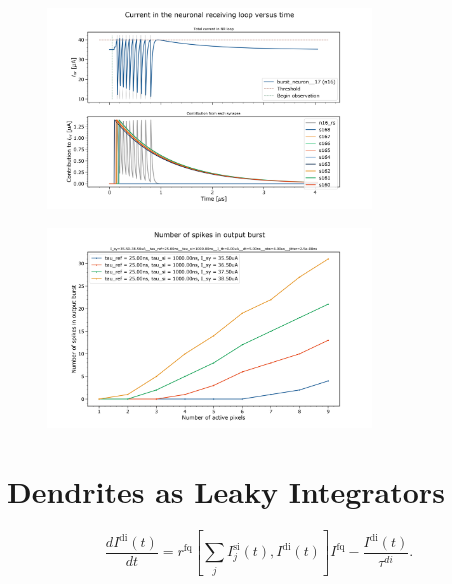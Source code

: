 \documentclass[twocolumn]{article}
\begin{document}
\begin{figure}[htb]
\includegraphics[width=8.6cm]{figures/point_neuron__nine_pixel__burst_receiving_loop_current.png}
\end{figure}

\begin{figure}[htb]
\includegraphics[width=8.6cm]{figures/point_neuron__nine_pixel__burst_vs_num_active.png}
\end{figure}



\section{\label{sec:dendrites}Dendrites as Leaky Integrators}

\begin{equation}
\label{eq:leaky_integrator__SI_loop}
\frac{dI^{\mathrm{di}}(t)}{dt} = r^{\mathrm{fq}}\left[\sum_j I^{\mathrm{si}}_{j}(t),I^{\mathrm{di}}(t)\right] I^{\mathrm{fq}}-\frac{I^{\mathrm{di}}(t)}{\tau^{di}}.
\end{equation}

% 
\end{document}
